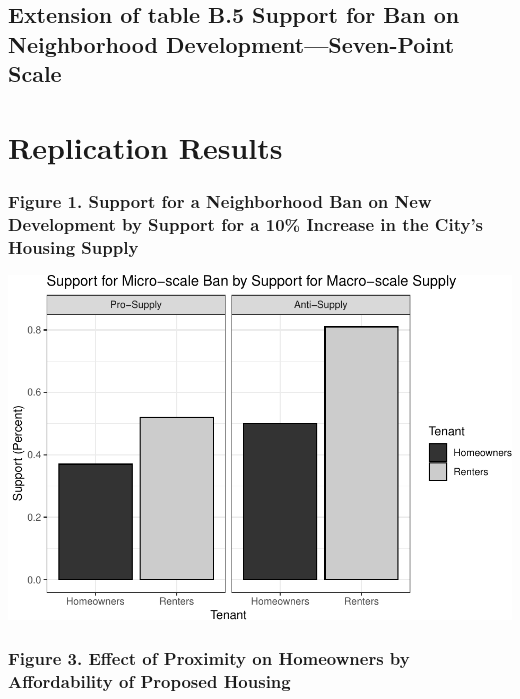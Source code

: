 \documentclass[]{article}
\begin{document}
\hypertarget{extension-of-table-b.5-support-for-ban-on-neighborhood-developmentseven-point-scale}{%
\subsection{Extension of table B.5 Support for Ban on Neighborhood Development---Seven-Point Scale}\label{extension-of-table-b.5-support-for-ban-on-neighborhood-developmentseven-point-scale}}

\hypertarget{replication-results}{%
\section{Replication Results}\label{replication-results}}

\hypertarget{figure-1.-support-for-a-neighborhood-ban-on-new-development-by-support-for-a-10-increase-in-the-citys-housing-supply}{%
\subsubsection{Figure 1. Support for a Neighborhood Ban on New Development by Support for a 10\% Increase in the City's Housing Supply}\label{figure-1.-support-for-a-neighborhood-ban-on-new-development-by-support-for-a-10-increase-in-the-citys-housing-supply}}

\includegraphics{Zheng-Ruth-Renters-Paper_files/figure-latex/Figure 1-1.pdf}

\hypertarget{figure-3.-effect-of-proximity-on-homeowners-by-affordability-of-proposed-housing}{%
\subsubsection{Figure 3. Effect of Proximity on Homeowners by Affordability of Proposed Housing}\label{figure-3.-effect-of-proximity-on-homeowners-by-affordability-of-proposed-housing}}
\end{document}
